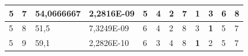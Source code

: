 \documentclass[conference]{IEEEtran}
\begin{document}
\begin{table}[]
\begin{tabular}{|llll|llllllll|}
\multicolumn{1}{|l|}{5}                                                     & \multicolumn{1}{l|}{7}                                                        & \multicolumn{1}{l|}{54,0666667}                                                   & 2,2816E-09                     & \multicolumn{1}{l|}{5}                                                  & \multicolumn{1}{l|}{4}                                                  & \multicolumn{1}{l|}{2}                                                  & \multicolumn{1}{l|}{7}                                                  & \multicolumn{1}{l|}{\textbf{1}}                                         & \multicolumn{1}{l|}{3}                                                  & \multicolumn{1}{l|}{6}                                                  & 8                          \\ \hline
\multicolumn{1}{|l|}{5}                                                     & \multicolumn{1}{l|}{8}                                                        & \multicolumn{1}{l|}{51,5}                                                         & 7,3249E-09                     & \multicolumn{1}{l|}{6}                                                  & \multicolumn{1}{l|}{4}                                                  & \multicolumn{1}{l|}{2}                                                  & \multicolumn{1}{l|}{8}                                                  & \multicolumn{1}{l|}{3}                                                  & \multicolumn{1}{l|}{\textbf{1}}                                         & \multicolumn{1}{l|}{5}                                                  & 7                          \\ \hline
\multicolumn{1}{|l|}{5}                                                     & \multicolumn{1}{l|}{9}                                                        & \multicolumn{1}{l|}{59,1}                                                         & 2,2826E-10                     & \multicolumn{1}{l|}{6}                                                  & \multicolumn{1}{l|}{3}                                                  & \multicolumn{1}{l|}{4}                                                  & \multicolumn{1}{l|}{8}                                                  & \multicolumn{1}{l|}{\textbf{1}}                                         & \multicolumn{1}{l|}{2}                                                  & \multicolumn{1}{l|}{5}                                                  & 7                          \\ \hline

\end{tabular}
\end{table}
\end{document}
